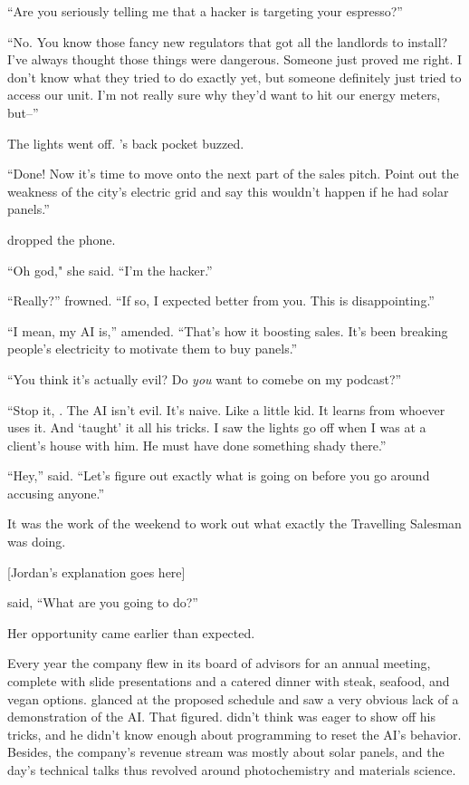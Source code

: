 ``Are you seriously telling me that a hacker is targeting your espresso?''

``No. You know those fancy new regulators that \crunchyCity{} got all the landlords to install? I’ve always thought those things were dangerous. Someone just proved me right. I don’t know what they tried to do exactly yet, but someone definitely just tried to access our unit. I’m not really sure why they’d want to hit our energy meters, but--''

The lights went off. {\protag}'s back pocket buzzed.

``Done! Now it's time to move onto the next part of the sales pitch. Point out the weakness of the city’s electric grid and say this wouldn't happen if he had solar panels.''

{\protag} dropped the phone.

``Oh god," she said. ``I’m the hacker.''

``Really?'' {\sidetag} frowned. ``If so, I expected better from you. This is disappointing.''

``I mean, my AI is,'' {\protag} amended. ``That’s how it boosting sales. It's been breaking people’s electricity to motivate them to buy panels.''

``You think it’s actually evil? Do \emph{you} want to comebe on my podcast?''

``Stop it, {\sidetag}. The AI isn't evil. It's naive. Like a little kid. It learns from whoever uses it. And \energyJerk{} `taught' it all his tricks. I saw the lights go off when I was at a client’s house with him. He must have done something shady there.''

``Hey,” {\sidetag} said. ``Let’s figure out exactly what is going on before you go around accusing anyone.''

It was the work of the weekend to work out what exactly the Travelling Salesman was doing.

[Jordan’s explanation goes here]

{\sidetag} said, ``What are you going to do?''

\sectionBreak{}

Her opportunity came earlier than expected.

Every year the company flew in its board of advisors for an annual meeting, complete with slide presentations and a catered dinner with steak, seafood, and vegan options. {\protag} glanced at the proposed schedule and saw a very obvious lack of a demonstration of the AI. That figured. {\protag} didn't think \energyJerk{} was eager to show off his tricks, and he didn't know enough about programming to reset the AI's behavior. Besides, the company's revenue stream was mostly about solar panels, and the day's technical talks thus revolved around photochemistry and materials science.

